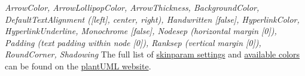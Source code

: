 \documentclass{article}
\begin{document}
\begin{multicols*}{3}
{\textit{
  ArrowColor, 
  ArrowLollipopColor, 
  ArrowThickness, 
  BackgroundColor, 
  DefaultTextAlignment {\small ([left], center, right)}, 
  Handwritten {\small [false]}, 
  HyperlinkColor, 
  HyperlinkUnderline, 
  Monochrome {\small [false]}, 
  Nodesep {\small (horizontal margin [0])}, 
  Padding {\small (text padding within node [0])}, 
  Ranksep {\small (vertical margin [0])}, 
  RoundCorner, 
  Shadowing
}
\newline\newline
The full list of \href{http://plantuml.com/skinparam}{skinparam settings} and \href{http://plantuml.com/color}{available colors} can be found on the \href{http://plantuml.com/}{plantUML website}.
}

\end{multicols*}
\end{document}

